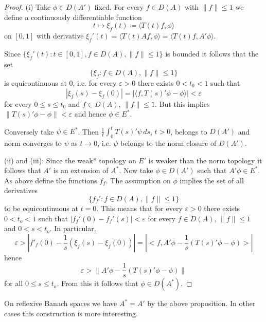 \begin{proof}
(i) Take $\phi \in D(A')$ fixed.
For every $f \in D(A)$ with $\|f\| \leq 1$ we define a continuously differentiable function
\[
    t \mapsto \xi_{f}(t) \coloneqq \langle T(t)f,\phi \rangle
\]
on $[0,1]$ with derivative $\xi_{f}'(t) = \langle T(t)Af,\phi \rangle = \langle T(t)f,A'\phi \rangle$.

Since $\{\xi_{f}'(t) : t \in [0,1], f \in D(A), \|f\| \leq 1\}$ is bounded it follows that the set
\[
    \{\xi_{f} : f \in D(A), \|f\| \leq 1\}
\]
is equicontinuous at $0$, i.e. for every $\varepsilon > 0$ there exists $0 < t_{0} < 1$ such that
\[
    |\xi_{f}(s) - \xi_{f}(0)| = |\langle f,T(s)'\phi - \phi \rangle| < \varepsilon
\]
for every $0 \leq s \leq t_{0}$ and $f \in D(A)$, $\|f\| \leq 1$.
But this implies $\|T(s)'\phi - \phi\| < \varepsilon$ and hence $\phi \in E^{*}$.

Conversely take $\psi \in E^{*}$.
Then $\frac{1}{t}\int_{0}^{t} T(s)'\psi \,ds$, $t > 0$, belongs to $D(A')$ and norm converges to $\psi$ as $t \to 0$, i.e. $\psi$ belongs to the norm closure of $D(A')$.

(ii) and (iii): Since the weak* topology on $E'$ is weaker than the norm topology it follows that $A'$ is an extension of $A^{*}$.
Now take $\phi \in D(A')$ such that $A'\phi \in E^{*}$.
As above define the functions $f_f$. 
The assumption on $\phi$ implies the set of all derivatives
\[
\{f_f' : f \in D(A), \|f\| \leq 1\}
\]
to be equicontinuous at $t = 0$. 
This means that for every $\varepsilon > 0$ there exists $0 < t_o < 1$ such that $|f_f'(0) - f_f'(s)| < \varepsilon$ for every $f \in D(A)$, $\|f\| \leq 1$ and $0 < s < t_o$.
In particular,
\[
    \varepsilon > |f'_f(0) - \frac{1}{s}(\xi_f(s)-\xi_f(0))| = |<f,A'\phi - \frac{1}{s}(T(s)'\phi-\phi)>|
\]
hence
\[
    \varepsilon > \|A'\phi - \frac{1}{s}(T(s)'\phi-\phi)\|
\]
for all $0 \leq s \leq t_o$.
From this it follows that $\phi \in D(A^*)$.

\end{proof}
On reflexive Banach spaces we have $A^* = A'$ by the above proposition.
In other cases this construction is more interesting.
